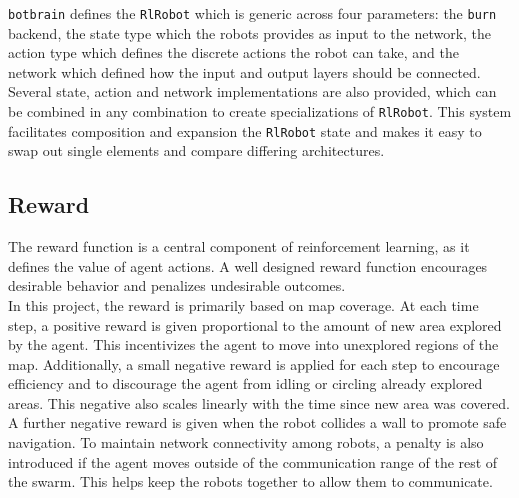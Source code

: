 \texttt{botbrain} defines the \texttt{RlRobot} which is generic across four parameters: the \texttt{burn} backend, the state type which the robots provides as input to the network, the action type which defines the discrete actions the robot can take, and the network which defined how the input and output layers should be connected. Several state, action and network implementations are also provided, which can be combined in any combination to create specializations of \texttt{RlRobot}. This system facilitates composition and expansion the \texttt{RlRobot} state and makes it easy to swap out single elements and compare differing architectures.







\subsection{Reward}
The reward function is a central component of reinforcement learning, as it defines the value of agent actions. A well designed reward function encourages desirable behavior and penalizes undesirable outcomes. \\

In this project, the reward is primarily based on map coverage. At each time step, a positive reward is given proportional to the amount of new area explored by the agent. This incentivizes the agent to move into unexplored regions of the map. Additionally, a small negative reward is applied for each step to encourage efficiency and to discourage the agent from idling or circling already explored areas. This negative also scales linearly with the time since new area was covered. A further negative reward is given when the robot collides a wall to promote safe navigation.
To maintain network connectivity among robots, a penalty is also introduced if the agent moves outside of the communication range of the rest of the swarm. This helps keep the robots together to allow them to communicate.

